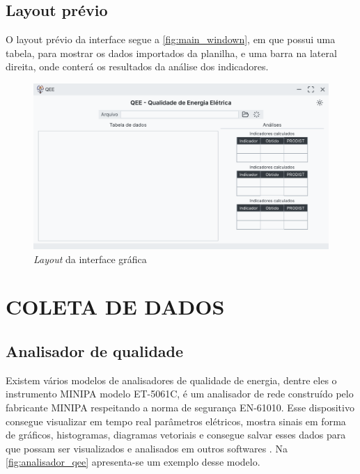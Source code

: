 \subsection{Layout prévio}

O layout prévio da interface segue a \autoref{fig:main_windown}, em que possui uma tabela, para mostrar os dados importados da planilha, e uma barra na lateral direita, onde conterá os resultados da análise dos indicadores.

\begin{figure}[H]
	\centering
	\caption{\textit{Layout} da interface gráfica}
	\label{fig:main_windown}
	\includegraphics[width=16cm]{illustrations/figures/main_windown.pdf}
\end{figure}

\section{COLETA DE DADOS}

\subsection{Analisador de qualidade}

Existem vários modelos de analisadores de qualidade de energia, dentre eles o instrumento MINIPA modelo ET-5061C, é um analisador de rede construído pelo fabricante MINIPA respeitando a norma de segurança EN-61010. Esse dispositivo consegue visualizar em tempo real parâmetros elétricos, mostra sinais em forma de gráficos, histogramas, diagramas vetoriais e consegue salvar esses dados para que possam ser visualizados e analisados em outros softwares \cite{ref:minipa_2019}. Na \autoref{fig:analisador_qee} apresenta-se um exemplo desse modelo.

